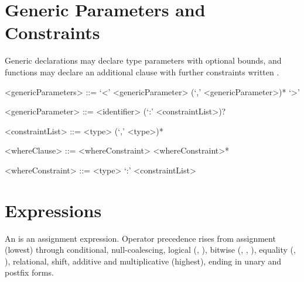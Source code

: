 \documentclass[makeidx]{article}
\begin{document}

\section{Generic Parameters and Constraints}

\LMHash{}%
Generic declarations may declare type parameters with optional bounds,
and functions may declare an additional  clause with
further constraints written .

\begin{grammar}
<genericParameters> ::= `<' <genericParameter> (`,' <genericParameter>)* `>'

<genericParameter> ::= <identifier> (`:' <constraintList>)?

<constraintList> ::= <type> (`,' <type>)*

<whereClause> ::= \WHERE{} <whereConstraint> <whereConstraint>*

<whereConstraint> ::= <type> `:' <constraintList>
\end{grammar}

\section{Expressions}

\LMHash{}%
An  is an assignment expression.
Operator precedence rises from assignment (lowest) through conditional,
null-coalescing, logical (, ), bitwise
(\code{|}, \code{\^}, \code{\&}), equality (, ),
relational, shift, additive and multiplicative (highest),
ending in unary and postfix forms.
\end{document}
